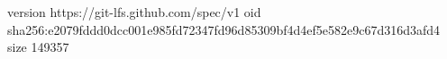 version https://git-lfs.github.com/spec/v1
oid sha256:e2079fddd0dcc001e985fd72347fd96d85309bf4d4ef5e582e9c67d316d3afd4
size 149357
